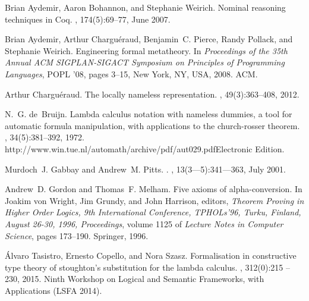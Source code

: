 \documentclass{entcs}
\begin{document}

%

\begin{thebibliography}{10}

Brian Aydemir, Aaron Bohannon, and Stephanie Weirich.
\newblock Nominal reasoning techniques in {C}oq.
, 174(5):69--77, June 2007.

Brian Aydemir, Arthur Chargu{\'e}raud, Benjamin~C. Pierce, Randy Pollack, and
  Stephanie Weirich.
\newblock Engineering formal metatheory.
\newblock In {\em Proceedings of the 35th Annual ACM SIGPLAN-SIGACT Symposium
  on Principles of Programming Languages}, POPL '08, pages 3--15, New York, NY,
  USA, 2008. ACM.

Arthur Chargu{\'{e}}raud.
\newblock The locally nameless representation.
, 49(3):363--408, 2012.

N.~G. de~Bruijn.
\newblock Lambda calculus notation with nameless dummies, a tool for automatic
  formula manipulation, with applications to the church-rosser theorem.
, 34(5):381--392, 1972.
\newblock http://www.win.tue.nl/automath/archive/pdf/aut029.pdfElectronic
  Edition.

Murdoch~J. Gabbay and Andrew~M. Pitts.
.
, 13(3—5):341—363, July 2001.

Andrew~D. Gordon and Thomas~F. Melham.
\newblock Five axioms of alpha-conversion.
\newblock In Joakim von Wright, Jim Grundy, and John Harrison, editors, {\em
  Theorem Proving in Higher Order Logics, 9th International Conference,
  TPHOLs'96, Turku, Finland, August 26-30, 1996, Proceedings}, volume 1125 of
  {\em Lecture Notes in Computer Science}, pages 173--190. Springer, 1996.

Álvaro Tasistro, Ernesto Copello, and Nora Szasz.
\newblock Formalisation in constructive type theory of stoughton's substitution
  for the lambda calculus.
, 312(0):215 --
  230, 2015.
\newblock Ninth Workshop on Logical and Semantic Frameworks, with Applications
  (LSFA 2014).


\end{thebibliography}
\end{document}
